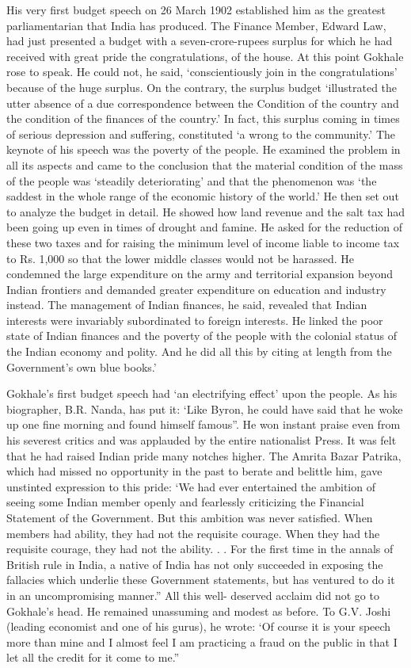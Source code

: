 His very first budget speech on 26 March 1902 established him as the greatest parliamentarian that India has produced. The Finance Member, Edward Law, had just presented a budget with a seven-crore-rupees surplus for which he had received with great pride the congratulations, of the house. At this point Gokhale rose to speak. He could not, he said, ‘conscientiously join in the congratulations’ because of the huge surplus. On the contrary, the surplus budget ‘illustrated the utter absence of a due correspondence between the Condition of the country and the condition of the finances of the country.’ In fact, this surplus coming in times of serious depression and suffering, constituted ‘a wrong to the community.’ The keynote of his speech was the poverty of the people. He examined the problem in all its aspects and came to the conclusion that the material condition of the mass of the people was ‘steadily deteriorating’ and that the phenomenon was ‘the saddest in the whole range of the economic history of the world.’ He then set out to analyze the budget in detail. He showed how land revenue and the salt tax had been going up even in times of drought and famine. He asked for the reduction of these two taxes and for raising the minimum level of income liable to income tax to Rs. 1,000 so that the lower middle classes would not be harassed. He condemned the large expenditure on the army and territorial expansion beyond Indian frontiers and demanded greater expenditure on education and industry instead. The management of Indian finances, he said, revealed that Indian interests were invariably subordinated to foreign interests. He linked the poor state of Indian finances and the poverty of the people with the colonial status of the Indian economy and polity. And he did all this by citing at length from the Government’s own blue books.’

Gokhale’s first budget speech had ‘an electrifying effect’ upon the people. As his biographer, B.R. Nanda, has put it: ‘Like Byron, he could have said that he woke up one fine morning and found himself famous”. He won instant praise even from his severest critics and was applauded by the entire nationalist Press. It was felt that he had raised Indian pride many notches higher. The Amrita Bazar Patrika, which had missed no opportunity in the past to berate and belittle him, gave unstinted expression to this pride: ‘We had ever entertained the ambition of seeing some Indian member openly and fearlessly criticizing the Financial Statement of the Government. But this ambition was never satisfied. When members had ability, they had not the requisite courage. When they had the requisite courage, they had not the ability. . . For the first time in the annals of British rule in India, a native of India has not only succeeded in exposing the fallacies which underlie these Government statements, but has ventured to do it in an uncompromising manner.” All this well- deserved acclaim did not go to Gokhale’s head. He remained unassuming and modest as before. To G.V. Joshi (leading economist and one of his gurus), he wrote: ‘Of course it is your speech more than mine and I almost feel I am practicing a fraud on the public in that I let all the credit for it come to me.”

